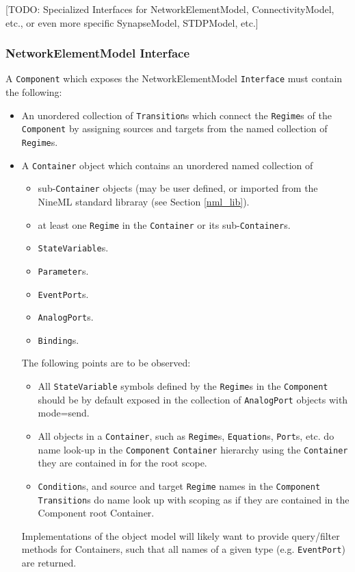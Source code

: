 \documentclass[a4paper]{article}
\newcommand\nmlClass[1]{{\tt #1}}
\begin{document}
[TODO: Specialized Interfaces for NetworkElementModel, ConnectivityModel, etc., or even more specific SynapseModel, STDPModel, etc.]



\subsubsection{NetworkElementModel Interface}
A \nmlClass{Component} which exposes the NetworkElementModel
\nmlClass{Interface} must contain the following:
\begin{itemize}
\item An unordered collection of \nmlClass{Transition}s which connect the \nmlClass{Regime}s
  of the \nmlClass{Component} by assigning sources and targets from the named
  collection of \nmlClass{Regime}s. 

\item A \nmlClass{Container} object which contains an unordered named collection of 
\begin{itemize}
\item sub-\nmlClass{Container} objects (may be user defined, or imported from the NineML standard libraray (see Section \ref{nml_lib}).
\item at least one \nmlClass{Regime} in the \nmlClass{Container} or its sub-\nmlClass{Container}s.
\item \nmlClass{StateVariable}s.
\item \nmlClass{Parameter}s.
\item \nmlClass{EventPort}s.
\item \nmlClass{AnalogPort}s.
\item \nmlClass{Binding}s.
\end{itemize}

The following points are to be observed:
\begin{itemize}
\item All \nmlClass{StateVariable} symbols defined by the
  \nmlClass{Regime}s in the \nmlClass{Component} should be by default
  exposed in the collection of \nmlClass{AnalogPort} objects with
  mode=send.
\item All objects in a \nmlClass{Container}, such as
  \nmlClass{Regime}s, \nmlClass{Equation}s, \nmlClass{Port}s, etc. do
  name look-up in the \nmlClass{Component} \nmlClass{Container}
  hierarchy using the \nmlClass{Container} they are contained in for
  the root scope.
\item \nmlClass{Condition}s, and source and target \nmlClass{Regime}
  names in the \nmlClass{Component} \nmlClass{Transition}s do name
  look up with scoping as if they are contained in the Component root
  Container.
\end{itemize}

Implementations of the object model will likely want to provide
query/filter methods for Containers, such that all names of a given
type (e.g. \nmlClass{EventPort}) are returned.

\end{itemize}
\end{document}
